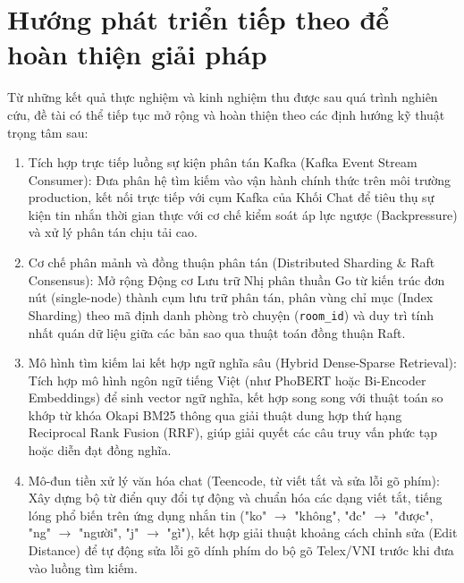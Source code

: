 \documentclass[12pt,a4paper,oneside]{report}
\begin{document}
\section{Hướng phát triển tiếp theo để hoàn thiện giải pháp}
Từ những kết quả thực nghiệm và kinh nghiệm thu được sau quá trình nghiên cứu, đề tài có thể tiếp tục mở rộng và hoàn thiện theo các định hướng kỹ thuật trọng tâm sau:
\begin{enumerate}
    \item Tích hợp trực tiếp luồng sự kiện phân tán Kafka (Kafka Event Stream Consumer): Đưa phân hệ tìm kiếm vào vận hành chính thức trên môi trường production, kết nối trực tiếp với cụm Kafka của Khối Chat để tiêu thụ sự kiện tin nhắn thời gian thực với cơ chế kiểm soát áp lực ngược (Backpressure) và xử lý phân tán chịu tải cao.
    \item Cơ chế phân mảnh và đồng thuận phân tán (Distributed Sharding \& Raft Consensus): Mở rộng Động cơ Lưu trữ Nhị phân thuần Go từ kiến trúc đơn nút (single-node) thành cụm lưu trữ phân tán, phân vùng chỉ mục (Index Sharding) theo mã định danh phòng trò chuyện (\texttt{room\_id}) và duy trì tính nhất quán dữ liệu giữa các bản sao qua thuật toán đồng thuận Raft.
    \item Mô hình tìm kiếm lai kết hợp ngữ nghĩa sâu (Hybrid Dense-Sparse Retrieval): Tích hợp mô hình ngôn ngữ tiếng Việt (như PhoBERT hoặc Bi-Encoder Embeddings) để sinh vector ngữ nghĩa, kết hợp song song với thuật toán so khớp từ khóa Okapi BM25 thông qua giải thuật dung hợp thứ hạng Reciprocal Rank Fusion (RRF), giúp giải quyết các câu truy vấn phức tạp hoặc diễn đạt đồng nghĩa.
    \item Mô-đun tiền xử lý văn hóa chat (Teencode, từ viết tắt và sửa lỗi gõ phím): Xây dựng bộ từ điển quy đổi tự động và chuẩn hóa các dạng viết tắt, tiếng lóng phổ biến trên ứng dụng nhắn tin ("ko" $\to$ "không", "đc" $\to$ "được", "ng" $\to$ "người", "j" $\to$ "gì"), kết hợp giải thuật khoảng cách chỉnh sửa (Edit Distance) để tự động sửa lỗi gõ dính phím do bộ gõ Telex/VNI trước khi đưa vào luồng tìm kiếm.
\end{enumerate}

\addto\captionsvietnamese{\renewcommand{\bibname}{TÀI LIỆU THAM KHẢO}}
\renewcommand{\bibname}{TÀI LIỆU THAM KHẢO}
\end{document}
